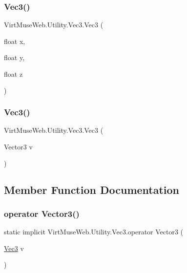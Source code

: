 \subsubsection{\texorpdfstring{Vec3()}{Vec3()}\hspace{0.1cm}{\footnotesize\ttfamily [2/3]}}
{\footnotesize\ttfamily Virt\+Muse\+Web.\+Utility.\+Vec3.\+Vec3 (\begin{DoxyParamCaption}\item[{float}]{x,  }\item[{float}]{y,  }\item[{float}]{z }\end{DoxyParamCaption})}

\mbox{\label{class_virt_muse_web_1_1_utility_1_1_vec3_a370e123870e29bb0364e0bcdeb76a2ec}} 
\subsubsection{\texorpdfstring{Vec3()}{Vec3()}\hspace{0.1cm}{\footnotesize\ttfamily [3/3]}}
{\footnotesize\ttfamily Virt\+Muse\+Web.\+Utility.\+Vec3.\+Vec3 (\begin{DoxyParamCaption}\item[{Vector3}]{v }\end{DoxyParamCaption})}



\subsection{Member Function Documentation}
\mbox{\label{class_virt_muse_web_1_1_utility_1_1_vec3_af34a58052ccc174dce6803eeabaa9647}} 
\subsubsection{\texorpdfstring{operator Vector3()}{operator Vector3()}}
{\footnotesize\ttfamily static implicit Virt\+Muse\+Web.\+Utility.\+Vec3.\+operator Vector3 (\begin{DoxyParamCaption}\item[{\mbox{\hyperlink{class_virt_muse_web_1_1_utility_1_1_vec3}{Vec3}}}]{v }\end{DoxyParamCaption})\hspace{0.3cm}{\ttfamily [static]}}



